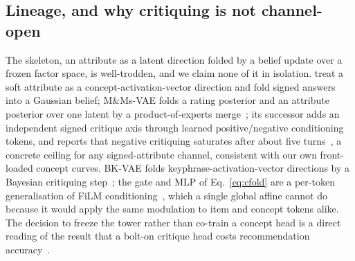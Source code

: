 \documentclass[acmsmall,review,anonymous]{acmart}
\begin{document}
\subsection{Lineage, and why critiquing is not channel-open}\label{sec:concept:lineage}

The skeleton, an attribute as a latent direction folded by a belief update over a frozen factor space, is well-trodden, and we claim none of it in isolation. \citet{biyik2023soft} treat a soft attribute as a concept-activation-vector direction and fold signed answers into a Gaussian belief; M\&Ms-VAE folds a rating posterior and an attribute posterior over one latent by a product-of-experts merge~\citep{antognini2021mmvae}; its successor adds an independent signed critique axis through learned positive/negative conditioning tokens, and reports that negative critiquing saturates after about five turns~\citep{antognini2022posneg}, a concrete ceiling for any signed-attribute channel, consistent with our own front-loaded concept curves. BK-VAE folds keyphrase-activation-vector directions by a Bayesian critiquing step~\citep{yang2021bkvae}; the gate and MLP of Eq.~\eqref{eq:cfold} are a per-token generalisation of FiLM conditioning~\citep{perez2018film}, which a single global affine cannot do because it would apply the same modulation to item and concept tokens alike. The decision to freeze the tower rather than co-train a concept head is a direct reading of the result that a bolt-on critique head costs recommendation accuracy~\citep{wu2019dlc,luo2020cevae}.
\end{document}
